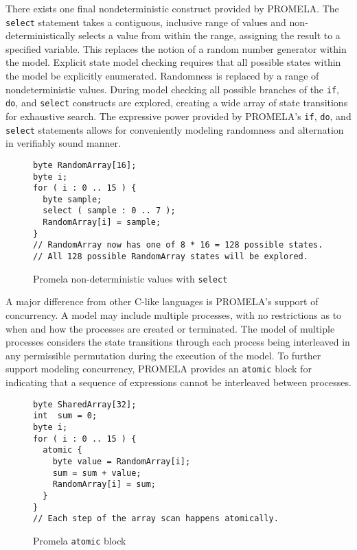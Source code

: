 There exists one final nondeterministic construct provided by PROMELA.
The \texttt{select} statement takes a contiguous, inclusive range of values and non-deterministically selects a value from within the range, assigning the result to a specified variable.
This replaces the notion of a random number generator within the model.
Explicit state model checking requires that all possible states within the model be explicitly enumerated.
Randomness is replaced by a range of nondeterministic values.
During model checking all possible branches of the \texttt{if}, \texttt{do}, and \texttt{select} constructs are explored, creating a wide array of state transitions for exhaustive search.
The expressive power provided by PROMELA's \texttt{if}, \texttt{do}, and \texttt{select} statements allows for conveniently modeling randomness and alternation in verifiably sound manner.

\begin{figure}
\centering
\caption{Promela non-deterministic values with \texttt{select}}
\begin{verbatim}
byte RandomArray[16];
byte i;
for ( i : 0 .. 15 ) {
  byte sample;
  select ( sample : 0 .. 7 );
  RandomArray[i] = sample;
}
// RandomArray now has one of 8 * 16 = 128 possible states.
// All 128 possible RandomArray states will be explored.
\end{verbatim}
\end{figure}

A major difference from other C-like languages is PROMELA's support of concurrency.
A model may include multiple processes, with no restrictions as to when and how the processes are created or terminated.
The model of multiple processes considers the state transitions through each process being interleaved in any permissible permutation during the execution of the model.
To further support modeling concurrency, PROMELA provides an \texttt{atomic} block for indicating that a sequence of expressions cannot be interleaved between processes.

\begin{figure}
\centering
\caption{Promela \texttt{atomic} block}
\begin{verbatim}
byte SharedArray[32];
int  sum = 0; 
byte i;
for ( i : 0 .. 15 ) {
  atomic {
    byte value = RandomArray[i];
    sum = sum + value;
    RandomArray[i] = sum;
  }
}
// Each step of the array scan happens atomically.
\end{verbatim}
\end{figure}

